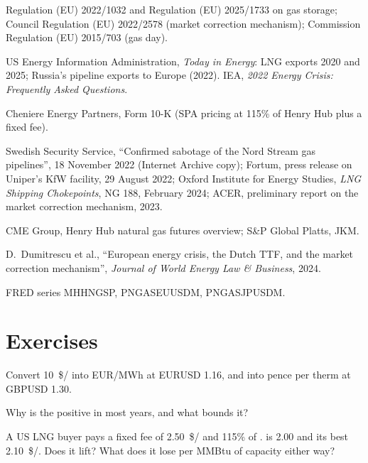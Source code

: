 \begin{omsources}
\item Regulation (EU) 2022/1032 and Regulation (EU) 2025/1733 on gas storage; Council
Regulation (EU) 2022/2578 (market correction mechanism); Commission Regulation (EU)
2015/703 (gas day).
\item US Energy Information Administration, \emph{Today in Energy}: LNG exports 2020 and
2025; Russia's pipeline exports to Europe (2022). IEA, \emph{2022 Energy Crisis: Frequently
Asked Questions}.
\item Cheniere Energy Partners, Form 10-K (SPA pricing at 115\% of Henry Hub plus a fixed
fee).
\item Swedish Security Service, ``Confirmed sabotage of the Nord Stream gas pipelines'', 18 November 2022 (Internet Archive
copy); Fortum, press release on Uniper's KfW facility, 29 August 2022; Oxford Institute for Energy Studies, \emph{LNG
Shipping Chokepoints}, NG 188, February 2024; ACER, preliminary report on the market correction
mechanism, 2023.
\item CME Group, Henry Hub natural gas futures overview; S\&P Global Platts, JKM.
\item D.~Dumitrescu et al., ``European energy crisis, the Dutch TTF, and the market
correction mechanism'', \emph{Journal of World Energy Law \& Business}, 2024.
\item FRED series MHHNGSP, PNGASEUUSDM, PNGASJPUSDM.
\end{omsources}

\section{Exercises}

\begin{exercise}[$\star$]\label{exo:m3:natural-gas-and-lng:1}
Convert \qty{10}{\$/\mmbtu} into EUR/MWh at EURUSD 1.16, and into pence per therm at
GBPUSD 1.30.
\end{exercise}

\begin{exercise}[$\star$]\label{exo:m3:natural-gas-and-lng:2}
Why is the  positive in most years, and what bounds it?
\end{exercise}

\begin{exercise}[$\star$]\label{exo:m3:natural-gas-and-lng:3}
A US LNG buyer pays a fixed fee of \qty{2.50}{\$/\mmbtu} and 115\% of . 
is \qty{2.00}{} and its best  \qty{2.10}{\$/\mmbtu}. Does it lift? What does it lose
per MMBtu of capacity either way?
\end{exercise}

